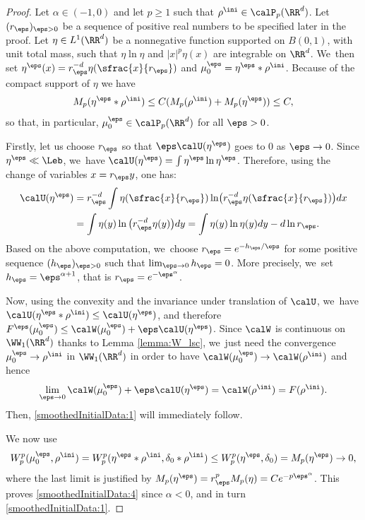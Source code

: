 \begin{proof}
Let $\alpha \in (-1,0)$ and let $p \geq 1$ such that $\rho^{\ini} \in \calP_p(\RR^d)$. Let $(r_\eps)_{\eps > 0}$ be a sequence of positive real numbers to be specified later in the proof. Let $\eta \in L^1(\RR^d)$ be a nonnegative function supported on $B(0,1)$, with unit total mass, such that $\eta \ln \eta$ and $|x|^p \eta(x)$ are integrable on $\RR^d$. We~then set $\eta^\eps(x) = r_\eps^{-d} \eta(\sfrac{x}{r_\eps})$ and $\mu_0^\eps = \eta^\eps * \rho^{\ini}$. Because of the compact support of $\eta$ we have
\[
M_p(\eta^\eps * \rho^{\ini}) \leq C(M_p(\rho^{\ini})+M_p(\eta^\eps))\leq C,
\]
so that, in particular, $\mu_0^\eps \in \calP_p(\RR^d)$ for all $\eps>0$.

Firstly, let us choose $r_\eps$ so that $\eps \calU(\eta^\eps)$ goes to 0 as $\eps \to 0$. Since $\eta^\eps \ll \Leb$, we~have $\calU(\eta^\eps) = \int \eta^\eps \ln \eta^\eps$. Therefore, using the change of variables $x = r_\eps y$, one has:
\[
\begin{aligned}
\calU(\eta^\eps) &= r_\eps^{-d} \int \eta(\sfrac{x}{r_\eps}) \ln \bigl( r_\eps^{-d} \eta(\sfrac{x}{r_\eps}) \bigr) dx\\
& = \int \eta(y) \ln \big(r_\eps^{-d} \eta(y)\big) dy 
= \int \eta(y) \ln \eta(y) dy - d \ln r_\eps.
\end{aligned}
\]
Based on the above computation, we~choose $r_\eps = e^{-h_\eps / \eps}$ for some positive sequence $(h_\eps)_{\eps>0}$ such that $\lim_{\eps \to 0} h_\eps = 0$. More precisely, we~set $h_\eps = \eps^{\alpha + 1}$, that is $r_\eps = e^{-\eps^\alpha}$.

Now, using the convexity and the invariance under translation of $\calU$, we~have \hbox{$\calU(\eta^\eps * \rho^{\ini}) \leq \calU(\eta^\eps)$}, and therefore $F^\eps(\mu_0^\eps) \leq \calW(\mu_0^\eps) + \eps \calU(\eta^\eps)$. Since $\calW$ is continuous on $\WW_1(\RR^d)$ thanks to Lemma \ref{lemma:W_lsc}, we~just need the convergence $\mu_0^\eps\to\rho^{\ini}$ in $\WW_1(\RR^d)$ in order to have $\calW(\mu_0^\eps) \to \calW(\rho^{\ini})$ and hence
\[
\lim_{\eps \to 0} \calW(\mu_0^\eps) + \eps \calU(\eta^\eps) = \calW(\rho^{\ini}) = F(\rho^{\ini}).
\]
Then, \eqref{smoothedInitialData:1} will immediately follow.

We now use
\[
W_p^p(\mu_0^\eps,\rho^{\ini}) = W_p^p(\eta^\eps * \rho^{\ini}, \delta_0 * \rho^{\ini}) \leq W_p^p(\eta^\eps, \delta_0) = M_p(\eta^\eps)\to 0,
\]
where the last limit is justified by $M_p(\eta^\eps) = r_\eps^p M_p(\eta) = C e^{-p\eps^\alpha}$. This proves
\eqref{smoothedInitialData:4} since $\alpha < 0$, and in turn \eqref{smoothedInitialData:1}.
\end{proof}
